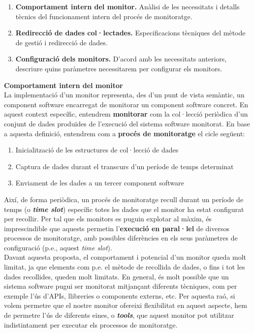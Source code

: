 \begin{enumerate}
\item \textbf{Comportament intern del monitor.} Anàlisi de les necessitats i detalls tècnics del funcionament intern del procés de monitoratge.
\item \textbf{Redirecció de dades col·lectades.} Especificacions tècniques del mètode de gestió i redirecció de dades.
\item \textbf{Configuració dels monitors.} D'acord amb les necessitats anteriors, descriure quins paràmetres necessitarem per configurar els monitors.
\end{enumerate}

\noindent \textbf{\large Comportament intern del monitor}\\

\noindent La implementació d'un monitor representa, des d'un punt de vista semàntic, un component software encarregat de monitorar un component software concret. En aquest context específic, entendrem \textbf{monitorar} com la col·lecció periòdica d'un conjunt de dades produïdes de l'execució del sistema software monitorat. En base a aquesta definició, entendrem com a \textbf{procés de monitoratge} el cicle següent:

\begin{enumerate}
\item Inicialització de les estructures de col·lecció de dades
\item Captura de dades durant el transcurs d'un període de temps determinat
\item Enviament de les dades a un tercer component software
\end{enumerate}

Així, de forma periòdica, un procés de monitoratge recull durant un període de temps (o \textbf{\textit{time slot}}) específic totes les dades que el monitor ha estat configurat per recollir. Per tal que els monitors es puguin explotar al màxim, és imprescindible que aquests permetin l'\textbf{execució en paral·lel} de diversos processos de monitoratge, amb possibles diferències en els seus paràmetres de configuració (p.e., aquest \textit{time slot}).\\

Davant aquesta proposta, el comportament i potencial d'un monitor queda molt limitat, ja que elements com p.e. el mètode de recollida de dades, o fins i tot les dades recollides, queden molt limitats. En general, és molt possible que un sistema software pugui ser monitorat mitjançant diferents tècniques, com per exemple l'ús d'APIs, llibreries o components externs, etc. Per aquesta raó, si volem permetre que el nostre monitor ofereixi flexibilitat en aquest aspecte, hem de permetre l'ús de diferents eines, o \textbf{\textit{tools}}, que aquest monitor pot utilitzar indistintament per executar els processos de monitoratge.\\

